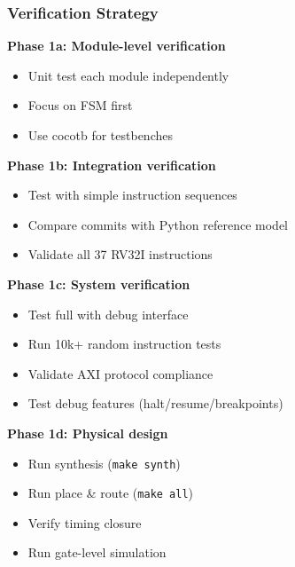 \subsubsection{Verification Strategy}\label{cr:fix:cpu-integration-summary:verification-strategy}

\begin{record}

\textbf{Phase 1a: Module-level verification}

\begin{itemize}
\tightlist
\item
  Unit test each module independently
\item
  Focus on  FSM first
\item
  Use cocotb for testbenches
\end{itemize}

\textbf{Phase 1b: Integration verification}

\begin{itemize}
\tightlist
\item
  Test  with simple instruction sequences
\item
  Compare commits with Python reference model
\item
  Validate all 37 RV32I instructions
\end{itemize}

\textbf{Phase 1c: System verification}

\begin{itemize}
\tightlist
\item
  Test full  with debug interface
\item
  Run 10k+ random instruction tests
\item
  Validate AXI protocol compliance
\item
  Test debug features
  (halt/\allowbreak{}resume/\allowbreak{}breakpoints)
\end{itemize}

\textbf{Phase 1d: Physical design}

\begin{itemize}
\tightlist
\item
  Run synthesis (\texttt{make\ synth})
\item
  Run place \& route (\texttt{make\ all})
\item
  Verify timing closure
\item
  Run gate-level simulation
\end{itemize}

\end{record}


